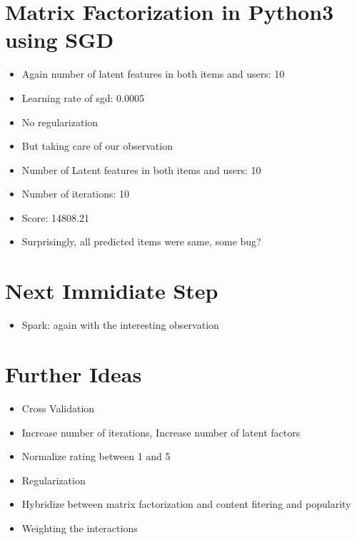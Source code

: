 \documentclass{article}
\begin{document}
\section{Matrix Factorization in Python3 using SGD}
\begin{itemize}
\item Again number of latent features in both items and users: 10
\item Learning rate of sgd: 0.0005
\item No regularization
\item But taking care of our observation
 \item Number of Latent features in both items and users: 10
 \item Number of iterations: 10 
 \item Score: 14808.21
 \item Surprisingly, all predicted items were same, some bug?
\end{itemize}



 \section{Next Immidiate Step}
 \begin{itemize}
  \item Spark: again with the interesting observation
 \end{itemize}

 \section{Further Ideas}
 \begin{itemize}
  \item Cross Validation
  \item Increase number of iterations, Increase number of latent factors
  \item Normalize rating between 1 and 5
  \item Regularization
  \item Hybridize between matrix factorization and content fitering and popularity
  \item Weighting the interactions
 \end{itemize}

\end{document}
